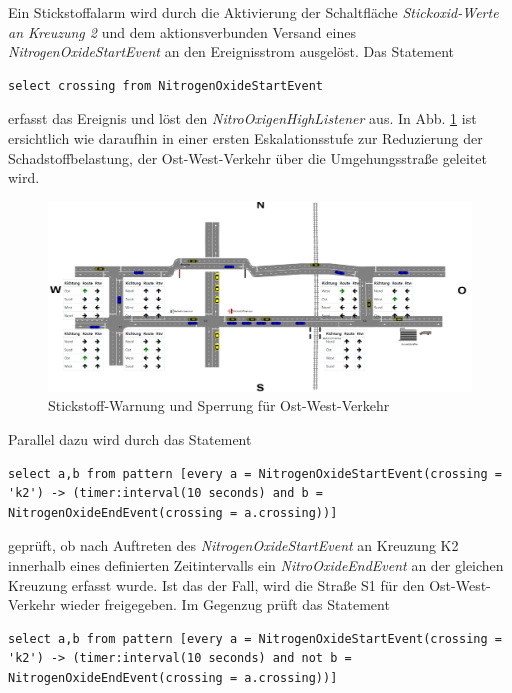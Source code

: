 Ein Stickstoffalarm wird durch die Aktivierung der Schaltfläche \textit{Stickoxid-Werte an Kreuzung 2} und dem aktionsverbunden Versand eines \textit{NitrogenOxideStartEvent} an den Ereignisstrom ausgelöst. Das Statement

\begin{lstlisting}
select crossing from NitrogenOxideStartEvent
\end{lstlisting}

erfasst das Ereignis und löst den \textit{NitroOxigenHighListener} aus. In Abb. \ref{fig8} ist ersichtlich wie daraufhin in einer ersten Eskalationsstufe zur Reduzierung der Schadstoffbelastung, der Ost-West-Verkehr über die Umgehungsstraße geleitet wird. 

\begin{figure}[ht]
	\includegraphics[width=\textwidth]{images/NitroOxigenHigh.png}
	\caption{Stickstoff-Warnung und Sperrung für Ost-West-Verkehr}
	\label{fig8}
\end{figure}

Parallel dazu wird durch das Statement

\begin{lstlisting}
select a,b from pattern [every a = NitrogenOxideStartEvent(crossing = 'k2') -> (timer:interval(10 seconds) and b = NitrogenOxideEndEvent(crossing = a.crossing))]
\end{lstlisting}

geprüft, ob nach Auftreten des \textit{NitrogenOxideStartEvent} an Kreuzung K2 innerhalb eines definierten Zeitintervalls ein \textit{NitroOxideEndEvent} an der gleichen Kreuzung erfasst wurde. Ist das der Fall, wird die Straße S1 für den Ost-West-Verkehr wieder freigegeben. Im Gegenzug prüft das Statement

\begin{lstlisting}
select a,b from pattern [every a = NitrogenOxideStartEvent(crossing = 'k2') -> (timer:interval(10 seconds) and not b = NitrogenOxideEndEvent(crossing = a.crossing))]
\end{lstlisting}

